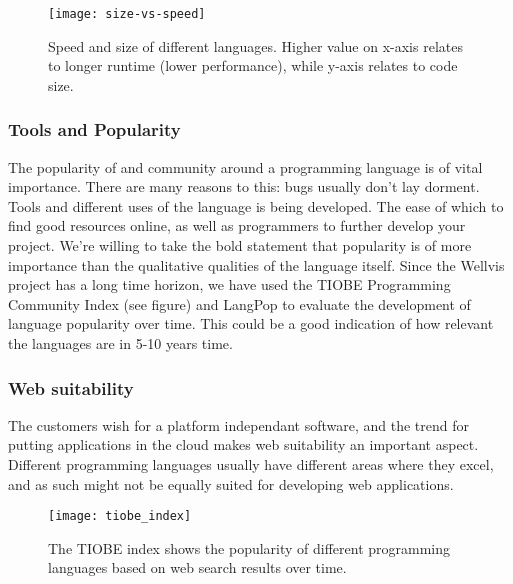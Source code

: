 \documentclass{report}
\begin{document}
\begin{figure}
    \centering
    \texttt{[image: size-vs-speed]}
    \caption{Speed and size of different languages\cite{website:the_computer_lang_benchmark_game}. Higher value on x-axis relates to longer runtime (lower performance), while y-axis relates to code size.}
    \label{fig:size-vs-speed}
\end{figure}

\subsubsection{Tools and Popularity}
The popularity of and community around a programming language is of vital importance. There are many reasons to this: bugs usually don't lay dorment. Tools and different uses of the language is being developed. The ease of which to find good resources online, as well as programmers to further develop your project. We're willing to take the bold statement that popularity is of more importance than the qualitative qualities of the language itself.
Since the Wellvis project has a long time horizon, we have used the TIOBE Programming Community Index\cite{website:proglang_popularity_2} (see figure) and LangPop\cite{website:proglang_popularity} to evaluate the development of language popularity over time. This could be a good indication of how relevant the languages are in 5-10 years time.

\subsubsection{Web suitability}
The customers wish for a platform independant software, and the trend for putting applications in the cloud makes web suitability an important aspect. Different programming languages usually have different areas where they excel, and as such might not be equally suited for developing web applications.

\begin{figure}
    \centering
    \texttt{[image: tiobe\_index]}
    \caption{The TIOBE index\cite{website:proglang_popularity_2} shows the popularity of different programming languages based on web search results over time.}
    \label{fig:tiobe_index}
\end{figure}
\end{document}
